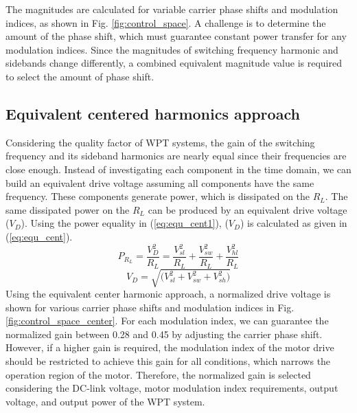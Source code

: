 \documentclass[journal]{IEEEtran}
\begin{document}
The magnitudes are calculated for variable carrier phase shifts and modulation indices, as shown in Fig. \ref{fig:control_space}. A challenge is to determine the amount of the phase shift, which must guarantee constant power transfer for any modulation indices. Since the magnitudes of switching frequency harmonic and sidebands change differently, a combined equivalent magnitude value is required to select the amount of phase shift.
 
\subsection{Equivalent centered harmonics approach}
Considering the quality factor of WPT systems, the gain of the switching frequency and its sideband harmonics are nearly equal since their frequencies are close enough. Instead of investigating each component in the time domain, we can build an equivalent drive voltage assuming all components have the same frequency.
These components generate power, which is dissipated on the $R_L$. The same dissipated power on the $R_L$ can be produced by an equivalent drive voltage ($V_D$). Using the power equality in  (\ref{eq:equ_cent1}),  ($V_D$) is calculated as given in (\ref{eq:equ_cent}).
\begin{equation}
\label{eq:equ_cent1}
P_{R_L}=\frac{V_{D}^2}{R_L}=\frac{V_{sl}^2}{R_L} +\frac{V_{sw}^2}{R_L} +\frac{V_{hl}^2}{R_L} 
\end{equation}
\begin{equation}
\label{eq:equ_cent}
V_{D}=  \sqrt{\bigg(V_{sl}^2+V_{sw}^2+V_{sh}^2 \bigg)}
\end{equation}
Using the equivalent center harmonic approach, a normalized drive voltage is shown for various carrier phase shifts and modulation indices in Fig. \ref{fig:control_space_center}. 
For each modulation index, we can guarantee the normalized gain between 0.28 and 0.45 by adjusting the carrier phase shift. 
However, if a higher gain is required, the modulation index of the motor drive should be restricted to achieve this gain for all conditions, which narrows the operation region of the motor. 
Therefore, the normalized gain is selected considering the DC-link voltage, motor modulation index requirements, output voltage, and output power of the WPT system.
\end{document}
